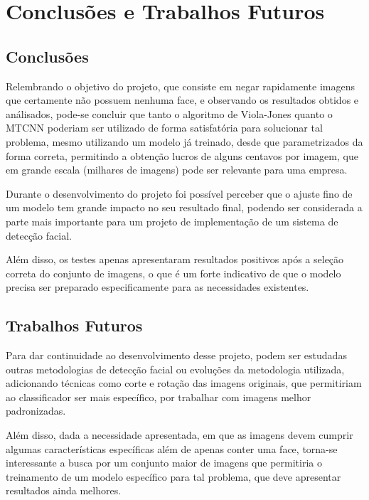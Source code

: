 \chapter{Conclusões e Trabalhos Futuros}\label{cap:conclusao}

\section{Conclusões}

Relembrando o objetivo do projeto, que consiste em negar rapidamente imagens que certamente não possuem nenhuma face, e observando os resultados obtidos e análisados, pode-se concluir que tanto o algoritmo de Viola-Jones quanto o MTCNN poderiam ser utilizado de forma satisfatória para solucionar tal problema, mesmo utilizando um modelo já treinado, desde que parametrizados da forma correta, permitindo a obtenção lucros de alguns centavos por imagem, que em grande escala (milhares de imagens) pode ser relevante para uma empresa.

Durante o desenvolvimento do projeto foi possível perceber que o ajuste fino de um modelo tem grande impacto no seu resultado final, podendo ser considerada a parte mais importante para um projeto de implementação de um sistema de detecção facial.

Além disso, os testes apenas apresentaram resultados positivos após a seleção correta do conjunto de imagens, o que é um forte indicativo de que o modelo precisa ser preparado especificamente para as necessidades existentes.

\section{Trabalhos Futuros}

Para dar continuidade ao desenvolvimento desse projeto, podem ser estudadas outras metodologias de detecção facial ou evoluções da metodologia utilizada, adicionando técnicas como corte e rotação das imagens originais, que permitiriam ao classificador ser mais específico, por trabalhar com imagens melhor padronizadas.

Além disso, dada a necessidade apresentada, em que as imagens devem cumprir algumas características específicas além de apenas conter uma face, torna-se interessante a busca por um conjunto maior de imagens que permitiria o treinamento de um modelo específico para tal problema, que deve apresentar resultados ainda melhores.

